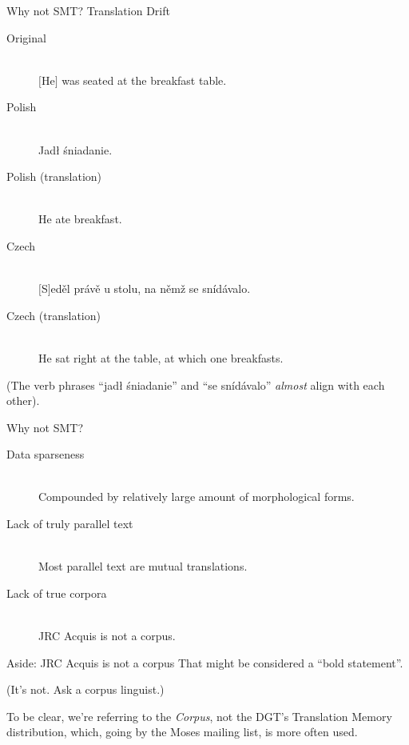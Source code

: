 \documentclass{beamer}
\begin{document}
\begin{frame}{Why not SMT? Translation Drift}
\begin{description}
  \item[Original] \hfill \\
  $[$He$]$ was seated at the breakfast table.
  \item[Polish] \hfill \\
  Jadł śniadanie.
  \item[Polish (translation)] \hfill \\
  He ate breakfast.
  \item[Czech] \hfill \\
  $[$S$]$eděl právě u stolu, na němž se snídávalo.
  \item[Czech (translation)] \hfill \\
  He sat right at the table, at which one breakfasts.
\end{description}

(The verb phrases ``jadł śniadanie'' and ``se snídávalo''
{\it almost} align with each other).

\end{frame}

\begin{frame}{Why not SMT?}
\begin{description}
  \item[Data sparseness] \hfill \\
  Compounded by relatively large amount of morphological forms.
  \item[Lack of truly parallel text] \hfill \\
  Most parallel text are mutual translations.
  \item[Lack of true corpora] \hfill \\
  JRC Acquis is not a corpus.
\end{description}

\end{frame}

\begin{frame}{Aside: JRC Acquis is not a corpus}
That might be considered a ``bold statement''.

(It's not. Ask a corpus linguist.)

\hbox{}

{\footnotesize To be clear, we're referring to the {\em Corpus}, not the DGT's Translation
Memory distribution, which, going by the Moses mailing list, is more often
used.}
\end{frame}
\end{document}
